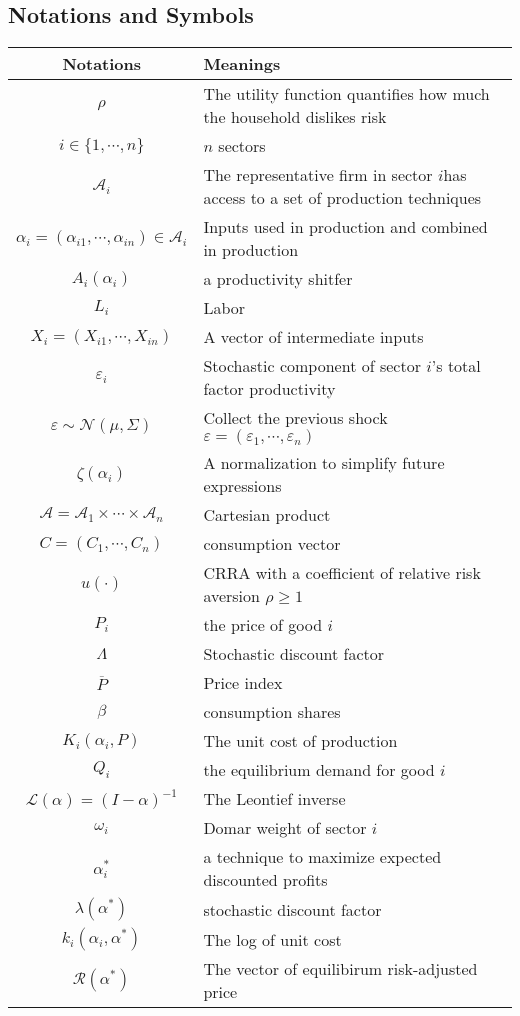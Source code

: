 \documentclass[11pt]{article}
\theoremstyle{definition}
\begin{document}
	\subsection*{Notations and Symbols}
	\begin{table}[H]
		\centering
		\begin{tabular}{c|l}
			\hline
			\textbf{Notations} & \textbf{Meanings} \\
			\hline
			$\rho$ & The utility function quantifies how much the household dislikes risk\\
			$i\in\{1,\cdots,n\}$ & $n$ sectors \\
			$\mathcal{A}_i$ & The representative firm in sector $i$has access to a set of production techniques\\ 
			$\alpha_i = (\alpha_{i1},\cdots,\alpha_{in}) \in \mathcal{A}_i$ & Inputs used in production and combined in production \\
			$A_i(\alpha_i)$ & a productivity shitfer \\
			$L_i$ & Labor \\
			$X_i = (X_{i1},\cdots, X_{in})$ & A vector of intermediate inputs \\
			$\varepsilon_i$ & Stochastic component of sector $i$'s total factor productivity \\
			$\varepsilon\sim\mathcal{N}(\mu,\Sigma)$ & Collect the previous shock $\varepsilon = (\varepsilon_1,\cdots,\varepsilon_n)$ \\
			$\zeta(\alpha_i)$ & A normalization to simplify future expressions \\
			$\mathcal{A} = \mathcal{A}_1\times\cdots\times\mathcal{A}_n$ & Cartesian product \\
			$C = (C_1,\cdots,C_n)$ & consumption vector \\
			$u(\cdot)$ & CRRA with a coefficient of relative risk aversion $\rho\geqslant 1$ \\
			$P_i$ & the price of good $i$ \\
			$\Lambda$ & Stochastic discount factor \\
			$\overline{P}$ & Price index \\
			$\beta$ & consumption shares \\
			$K_i(\alpha_i, P)$ & The unit cost of production \\
			$Q_i$ & the equilibrium demand for good $i$ \\
			$\mathcal{L}(\alpha) = (I - \alpha)^{-1}$ & The Leontief inverse \\
			$\omega_i$ & Domar weight of sector $i$ \\
			$\alpha_i^*$ & a technique to maximize expected discounted profits \\
			$\lambda(\alpha^*)$ & stochastic discount factor \\
			$k_i(\alpha_i,\alpha^*)$ & The log of unit cost \\
			$\mathcal{R}(\alpha^*)$ & The vector of equilibirum risk-adjusted price \\
			\hline
		\end{tabular}
	\end{table}
	
\end{document}
